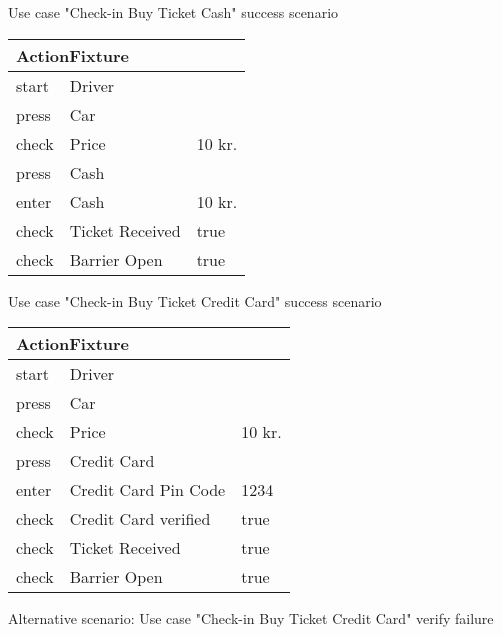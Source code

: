 
\noindent Use case "Check-in Buy Ticket Cash" success scenario
\madeby{\kj}{\mt}

\vspace{0.4cm}
\begin{tabular}{| p{2cm} | p{5.5cm} | p{5.5cm} |} \hline
\multicolumn{3}{|l|}{ActionFixture} \\ \hline
start & \multicolumn{2}{|l|}{Driver} \\ \hline
press & \multicolumn{2}{|l|}{Car} \\ \hline
check & Price & 10 kr. \\ \hline
press & \multicolumn{2}{|l|}{Cash} \\ \hline
enter & Cash & 10 kr. \\ \hline
check & Ticket Received & true \\ \hline
check & Barrier Open & true \\ \hline
\end{tabular}
\vspace{0.8cm}

\noindent Use case "Check-in Buy Ticket Credit Card" success scenario
\madeby{\kj}{\mt}

\vspace{0.4cm}
\begin{tabular}{| p{2cm} | p{5.5cm} | p{5.5cm} |} \hline
\multicolumn{3}{|l|}{ActionFixture} \\ \hline
start & \multicolumn{2}{|l|}{Driver} \\ \hline
press & \multicolumn{2}{|l|}{Car} \\ \hline
check & Price & 10 kr. \\ \hline
press & \multicolumn{2}{|l|}{Credit Card} \\ \hline
enter & Credit Card Pin Code & 1234 \\ \hline
check & Credit Card verified & true \\ \hline
check & Ticket Received & true \\ \hline
check & Barrier Open & true \\ \hline
\end{tabular}
\vspace{0.8cm}

\noindent Alternative scenario: Use case "Check-in Buy Ticket Credit Card" verify failure
\madeby{\kj}{\mt}

